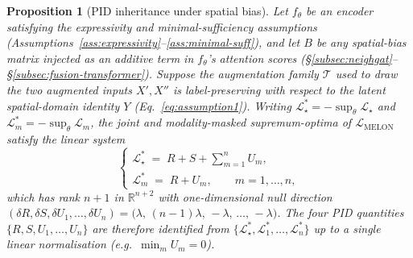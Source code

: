 \documentclass{article}
\theoremstyle{plain}
\newtheorem{proposition}{Proposition}
\theoremstyle{definition}
\begin{document}
\begin{proposition}[PID inheritance under spatial bias]\label{prop:pid-inheritance}
Let $f_\theta$ be an encoder satisfying the expressivity and minimal-sufficiency assumptions (Assumptions~\ref{ass:expressivity}--\ref{ass:minimal-suff}), and let $B$ be any spatial-bias matrix injected as an additive term in $f_\theta$'s attention scores (\S\ref{subsec:neighgat}--\S\ref{subsec:fusion-transformer}). Suppose the augmentation family $\mathcal{T}$ used to draw the two augmented inputs $X', X''$ is label-preserving with respect to the latent spatial-domain identity $Y$ (Eq.~\ref{eq:assumption1}). Writing $\mathcal{L}_{\star}^{*} = -\sup_{\theta}\mathcal{L}_{\star}$ and $\mathcal{L}_{m}^{*} = -\sup_{\theta}\mathcal{L}_{m}$, the joint and modality-masked supremum-optima of $\mathcal{L}_{\mathrm{MELON}}$ satisfy the linear system
\begin{equation}\label{eq:identif-system}
\begin{cases}
\mathcal{L}_{\star}^{*} \;=\; R + S + \sum_{m=1}^{n} U_m, \\[2pt]
\mathcal{L}_{m}^{*} \;=\; R + U_m, \qquad m = 1, \ldots, n,
\end{cases}
\end{equation}
which has rank $n+1$ in $\mathbb{R}^{n+2}$ with one-dimensional null direction $(\delta R, \delta S, \delta U_1, \ldots, \delta U_n) = \bigl(\lambda,\, (n-1)\lambda,\, -\lambda,\, \ldots,\, -\lambda\bigr)$. The four PID quantities $\{R, S, U_1, \ldots, U_n\}$ are therefore identified from $\{\mathcal{L}_{\star}^{*}, \mathcal{L}_{1}^{*}, \ldots, \mathcal{L}_{n}^{*}\}$ up to a single linear normalisation (e.g.\ $\min_m U_m = 0$).
\end{proposition}
\end{document}
